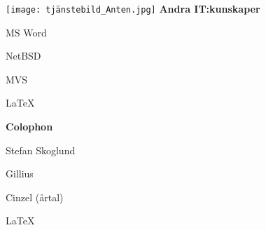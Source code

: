 \documentclass[a4paper,swedish,10pt]{article}
\begin{document}
\begin{minipage}[t]{0.24\textwidth}
  \raggedleft%
  \vspace{-\topskip+1cm}
  \texttt{[image: tjänstebild\_Anten.jpg]}
  \textbf{Andra IT:kunskaper}
  \begin{description}[nosep,itemsep=0.1ex]
    \raggedleft\setlength\itemsep{0.1ex}\small%
  \item MS Word
  \item NetBSD
  \item MVS
  \item \LaTeX
  \end{description}

  \vspace{13cm}
  \textbf{Colophon}
  \begin{description}[nosep,itemsep=0.1ex]
    \setlength\itemsep{0.1ex}\small%
  \item Stefan Skoglund {}
  \item Gillius
  \item Cinzel (årtal)
  \item \LaTeX%
  \end{description}%
\end{minipage}%
\end{document}
